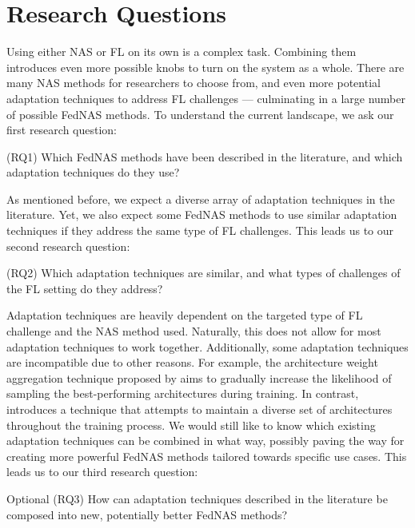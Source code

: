 \section{Research Questions}

Using either NAS or FL on its own is a complex task. Combining them introduces even more possible knobs to turn on the system as a whole. There are many NAS methods for researchers to choose from, and even more potential adaptation techniques to address FL challenges — culminating in a large number of possible FedNAS methods. To understand the current landscape, we ask our first research question:

\vspace{1em}
(RQ1) Which FedNAS methods have been described in the literature, and which adaptation techniques do they use?
\vspace{1em}

As mentioned before, we expect a diverse array of adaptation techniques in the literature. Yet, we also expect some FedNAS methods to use similar adaptation techniques if they address the same type of FL challenges. This leads us to our second research question:

\vspace{1em}
(RQ2) Which adaptation techniques are similar, and what types of challenges of the FL setting do they address?
\vspace{1em}

Adaptation techniques are heavily dependent on the targeted type of FL challenge and the NAS method used. Naturally, this does not allow for most adaptation techniques to work together. Additionally, some adaptation techniques are incompatible due to other reasons. For example, the architecture weight aggregation technique proposed by \cite{efnas_2024} aims to gradually increase the likelihood of sampling the best-performing architectures during training. In contrast, \cite{superfednas_2024} introduces a technique that attempts to maintain a diverse set of architectures throughout the training process. We would still like to know which existing adaptation techniques can be combined in what way, possibly paving the way for creating more powerful FedNAS methods tailored towards specific use cases. This leads us to our third research question:

\vspace{1em}
Optional (RQ3) How can adaptation techniques described in the literature be composed into new, potentially better FedNAS methods?
\vspace{1em}

